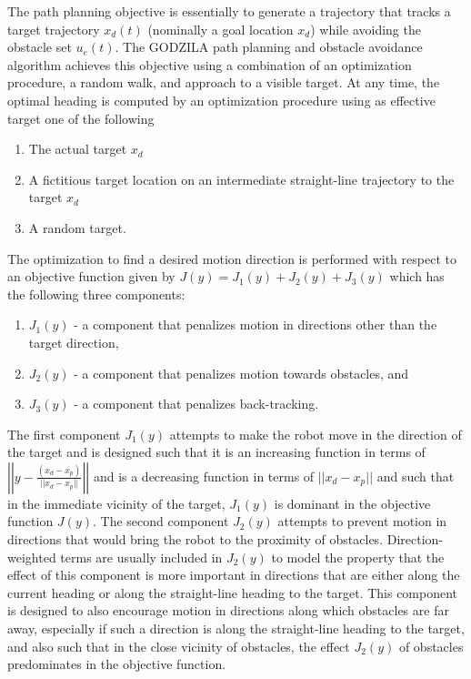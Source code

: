 \documentclass[10pt,conference]{ieeeconf}
\begin{document}
The path planning objective is essentially to generate a trajectory that tracks a
target trajectory $x_d (t)$ (nominally a goal location $x_d$) while avoiding the obstacle set $u_e(t)$.    
The GODZILA path planning and obstacle avoidance algorithm \cite{KK05b_jirs} achieves
this objective using a combination of an optimization procedure, a
random walk, and approach to a visible target.  At any time,
the optimal heading is computed by an optimization procedure using as
effective target one of the following
\begin{enumerate}
\item The actual target $x_d$
\item A fictitious target location on an intermediate straight-line
  trajectory to the target $x_d$
\item A random target. 
\end{enumerate}
The optimization to find a desired motion direction is performed with respect to an objective function given by
$J(y)=J_1(y)+J_2(y)+J_3(y)$
which has the following three components:
\begin{enumerate}
\item $J_1(y)$ - a component that penalizes motion in directions other than the target direction, 
\item $J_2(y)$ - a component that penalizes motion towards obstacles, and
\item $J_3(y)$ - a component that penalizes back-tracking.
\end{enumerate}
The first component $J_1(y)$ attempts to make the robot move
in the direction of the target and is designed such that it is an increasing
function in terms of $\left|\left|
y-\frac{(x_d-x_p)}{||x_d-x_p||}\right|\right|$ and is a decreasing function in
terms of 
$||x_d-x_p||$
and such that in the immediate
    vicinity of the target, $J_1(y)$ is dominant in the objective function
    $J(y)$.
The second component $J_2(y)$ attempts to prevent motion in directions
that would bring the robot to the proximity of obstacles. Direction-weighted
terms \cite{KK05b_jirs} are usually included in $J_2(y)$ to model the property that the
effect of this component is more important in directions that are
either along the current heading or along the straight-line heading to
the target.   This component is designed to also encourage motion in
directions along which obstacles are far away, especially if such a
direction is along the straight-line heading to the target, and also such that in the close vicinity of obstacles, the
effect $J_2(y)$ of obstacles predominates in the objective function.
\end{document}
